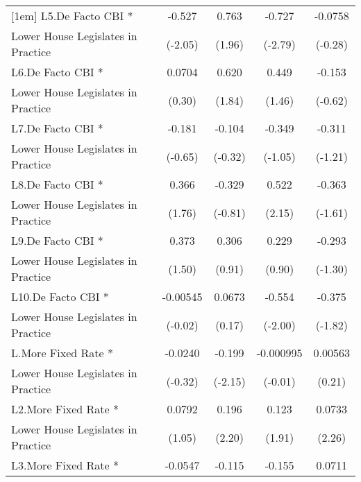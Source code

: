 {\begin{tabular}{l*{4}{c}}
[1em]
L5.De Facto CBI *   &      -0.527\sym{*}  &       0.763         &      -0.727\sym{**} &     -0.0758         \\
Lower House Legislates in Practice&     (-2.05)         &      (1.96)         &     (-2.79)         &     (-0.28)         \\
[1em]
L6.De Facto CBI *   &      0.0704         &       0.620         &       0.449         &      -0.153         \\
Lower House Legislates in Practice&      (0.30)         &      (1.84)         &      (1.46)         &     (-0.62)         \\
[1em]
L7.De Facto CBI *   &      -0.181         &      -0.104         &      -0.349         &      -0.311         \\
Lower House Legislates in Practice&     (-0.65)         &     (-0.32)         &     (-1.05)         &     (-1.21)         \\
[1em]
L8.De Facto CBI *   &       0.366         &      -0.329         &       0.522\sym{*}  &      -0.363         \\
Lower House Legislates in Practice&      (1.76)         &     (-0.81)         &      (2.15)         &     (-1.61)         \\
[1em]
L9.De Facto CBI *   &       0.373         &       0.306         &       0.229         &      -0.293         \\
Lower House Legislates in Practice&      (1.50)         &      (0.91)         &      (0.90)         &     (-1.30)         \\
[1em]
L10.De Facto CBI *  &    -0.00545         &      0.0673         &      -0.554\sym{*}  &      -0.375         \\
Lower House Legislates in Practice&     (-0.02)         &      (0.17)         &     (-2.00)         &     (-1.82)         \\
[1em]
L.More Fixed Rate * &     -0.0240         &      -0.199\sym{*}  &   -0.000995         &     0.00563         \\
Lower House Legislates in Practice&     (-0.32)         &     (-2.15)         &     (-0.01)         &      (0.21)         \\
[1em]
L2.More Fixed Rate *&      0.0792         &       0.196\sym{*}  &       0.123         &      0.0733\sym{*}  \\
Lower House Legislates in Practice&      (1.05)         &      (2.20)         &      (1.91)         &      (2.26)         \\
[1em]
L3.More Fixed Rate *&     -0.0547         &      -0.115         &      -0.155         &      0.0711         \\

\end{tabular}}
